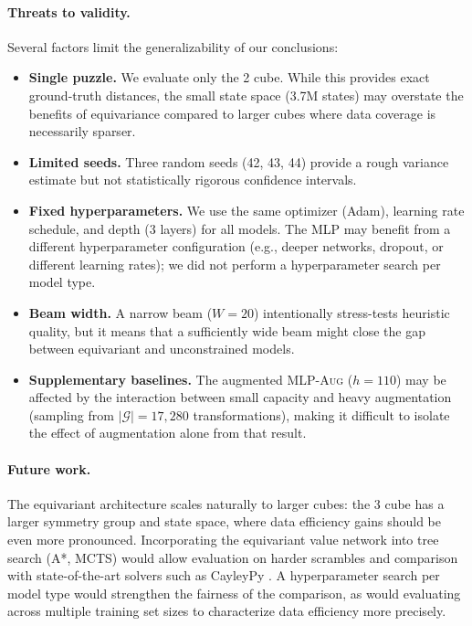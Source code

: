 \documentclass[11pt]{article}
\begin{document}
\paragraph{Threats to validity.}
Several factors limit the generalizability of our conclusions:
\begin{itemize}
  \item \textbf{Single puzzle.} We evaluate only the 2
    cube. While this provides exact ground-truth distances, the small state
    space (3.7M states) may overstate the benefits of equivariance compared
    to larger cubes where data coverage is necessarily sparser.
  \item \textbf{Limited seeds.} Three random seeds (42, 43, 44) provide a
    rough variance estimate but not statistically rigorous confidence
    intervals.
  \item \textbf{Fixed hyperparameters.} We use the same optimizer (Adam),
    learning rate schedule, and depth (3 layers) for all models.
    The \textsc{MLP} may benefit from a different hyperparameter
    configuration (e.g., deeper networks, dropout, or different learning
    rates); we did not perform a hyperparameter search per model type.
  \item \textbf{Beam width.} A narrow beam ($W = 20$) intentionally
    stress-tests heuristic quality, but it means that a sufficiently wide
    beam might close the gap between equivariant and unconstrained models.
  \item \textbf{Supplementary baselines.} The augmented \textsc{MLP-Aug}
    ($h = 110$) may be affected by the interaction between small capacity
    and heavy augmentation (sampling from $|\mathcal{G}| = 17{,}280$
    transformations), making it difficult to isolate the effect of
    augmentation alone from that result.
\end{itemize}

\paragraph{Future work.}
The equivariant architecture scales naturally to larger cubes: the
3 cube has a larger symmetry group and state space,
where data efficiency gains should be even more pronounced.
Incorporating the equivariant value network into tree search (A*, MCTS)
would allow evaluation on harder scrambles and comparison with state-of-the-art
solvers such as CayleyPy \cite{chervov2025cayleypy}.
A hyperparameter search per model type would strengthen the fairness of the
comparison, as would evaluating across multiple training set sizes to
characterize data efficiency more precisely.
\end{document}

